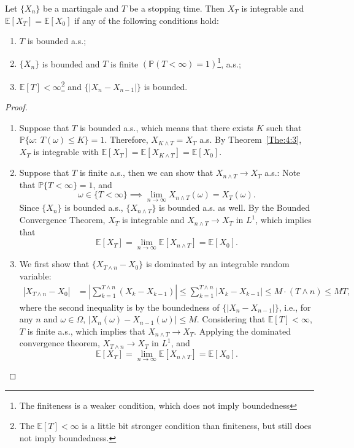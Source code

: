 \begin{theorem}
Let $\{X_n\}$ be a martingale and $T$ be a stopping time.
Then $X_T$ is integrable and $\mathbb{E}[X_T]=\mathbb{E}[X_0]$ if any of the following conditions hold:
\begin{enumerate}
\item
$T$ is bounded a.s.; %
\item
$\{X_n\}$ is bounded and $T$ is finite $(\mathbb{P}(T<\infty)=1)$\footnote{The finiteness is a weaker condition, which does not imply boundedness}, a.s.;
\item
$\mathbb{E}[T]<\infty$\footnote{The $\mathbb{E}[T]<\infty$ is a little bit stronger condition than finiteness, but still does not imply boundedness.} and $\{|X_n - X_{n-1}|\}$ is bounded.
\end{enumerate}
\end{theorem}
\begin{proof}
\begin{enumerate}
\item
Suppose that $T$ is bounded a.s., which means that there exists $K$ such that
$\mathbb{P}\{\omega:~T(\omega)\le K\}=1$.
Therefore, $X_{K\land T}=X_T$ a.s. By Theorem~\ref{The:4:3},
$X_T$ is integrable with $\mathbb{E}[X_T] = \mathbb{E}[X_{K\land T}]=\mathbb{E}[X_0]$.
\item
Suppose that $T$ is finite a.s., then we can show that $X_{n\land T}\to X_T$ a.s.:
Note that $\mathbb{P}\{T<\infty\}=1$, and
\[
\omega\in\{T<\infty\}\implies \lim_{n\to\infty}X_{n\land T}(\omega)= X_T(\omega).
\]
Since $\{X_n\}$ is bounded a.s., $\{X_{n\land T}\}$ is bounded a.s. as well.
By the Bounded Convergence Theorem, $X_T$ is integrable %
and $X_{n\land T}\to X_T$ in $L^1$, which implies that
\[
\mathbb{E}[X_T] = \lim_{n\to\infty}\mathbb{E}[X_{n\land T}]=\mathbb{E}[X_0].
\]
\item
We first show that $\{X_{T\land n}-X_0\}$ is dominated by an integrable random variable:
\begin{align*}
|X_{T\land n}-X_0|&=\left|
\sum_{k=1}^{T\land n}(X_k - X_{k-1})
\right|\le \sum_{k=1}^{T\land n}|X_k - X_{k-1}|\le M\cdot(T\land n)\le MT,
\end{align*}
where the second inequality is by the boundedness of $\{|X_n - X_{n-1}|\}$, i.e., for any $n$ and $\omega\in\Omega$, $|X_n(\omega) - X_{n-1}(\omega)|\le M$.
Considering that $\mathbb{E}[T]<\infty$, $T$ is finite a.s., %
which implies that $X_{n\land T}\to X_T$.
Applying the dominated convergence theorem, $X_{T\land n}\to X_T$ in $L^1$, and
\[
\mathbb{E}[X_T] = \lim_{n\to\infty}\mathbb{E}[X_{n\land T}]=\mathbb{E}[X_0].
\]
\end{enumerate}
\end{proof}

